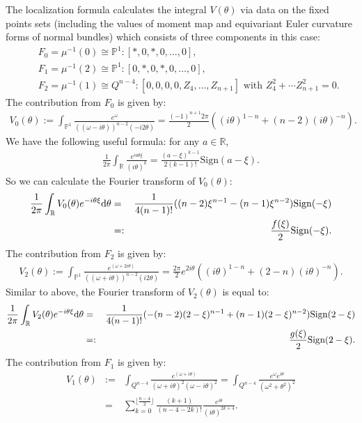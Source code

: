 \documentclass[12pt]{amsart}
\theoremstyle{definition}
\def\dif{{\rm d}}
\newcommand{\IP}{{\mathbb P}}
\newcommand{\IR}{{\mathbb R}}
\begin{document}
The localization formula calculates the integral $V(\theta)$ via data on the fixed points sets (including the values of moment map and equivariant Euler curvature forms of normal bundles) which consists of three components in this case:
\begin{eqnarray*}
    && F_0=\mu^{-1}(0)\cong \IP^1: [*, 0, *, 0, \dots, 0],\\
    && F_1=\mu^{-1}(2)\cong \IP^1: [0, *, 0, *, 0, \dots, 0],\\
    && F_2=\mu^{-1}(1)\cong Q^{n-4}: [0, 0, 0, 0, Z_4, \dots, Z_{n+1}] \text{ with } Z_4^2+\cdots Z_{n+1}^2=0.  
\end{eqnarray*}
The contribution from $F_0$ is given by:
\begin{eqnarray*}   V_0(\theta):=\int_{\IP^1}\frac{e^{\omega}}{((\omega-i\theta))^{n-2}(-i 2\theta)}=\frac{(-1)^{n+1}2\pi}{2}((i\theta)^{1-n}+(n-2)(i\theta)^{-n}). 
\end{eqnarray*}
We have the following useful formula: for any $a\in \IR$, 
\begin{eqnarray*}
    \frac{1}{2\pi}\int_\IR\frac{e^{i a \theta\xi}}{(i\theta)^k}=\frac{(a-\xi)^{k-1}}{2(k-1)!}
\mathrm{Sign}(a-\xi). \end{eqnarray*}
So we can calculate the Fourier transform of $V_0(\theta)$:
\begin{eqnarray*}
    \frac{1}{2\pi}\int_{\IR} V_0(\theta) e^{-i\theta \xi}\dif\theta&=&\frac{1}{4(n-1)!}((n-2)\xi^{n-1}-(n-1)\xi^{n-2})\mathrm{Sign}(-\xi)\\
    &=:& \frac{f(\xi)}{2} \mathrm{Sign}(-\xi).
\end{eqnarray*}
The contribution from $F_2$ is given by:
\begin{eqnarray*}
V_2(\theta):=\int_{\IP^1}\frac{e^{(\omega+2i\theta)}}{((\omega+i\theta))^{n-2}(i2\theta)}=\frac{2\pi }{2}e^{2i\theta}((i\theta)^{1-n}+(2-n)(i\theta)^{-n}).
\end{eqnarray*}
Similar to above, the Fourier transform of $V_2(\theta)$ is equal to:
\begin{eqnarray*}
    \frac{1}{2\pi}\int_{\IR} V_2(\theta) e^{-i\theta \xi}\dif\theta&=&\frac{1}{4(n-1)!}(-(n-2)(2-\xi)^{n-1}+(n-1)(2-\xi)^{n-2})\mathrm{Sign}(2-\xi)\\
    &=:& \frac{g(\xi)}{2} \mathrm{Sign}(2-\xi). 
\end{eqnarray*}
The contribution from $F_1$ is given by:
\begin{eqnarray*}    V_1(\theta)&:=&\int_{Q^{n-4}}\frac{e^{(\omega+i\theta)}}{(\omega+i\theta)^2(\omega-i\theta)^2}=\int_{Q^{n-4}}\frac{e^\omega e^{i\theta}}{(\omega^2+\theta^2)^2}\\
&=&\sum_{k=0}^{\lfloor\frac{n-4}{2}\rfloor}\frac{(k+1)}{(n-4-2k)!}\frac{e^{i\theta}}{(i\theta)^{2k+4}}.
\end{eqnarray*}
\end{document}

